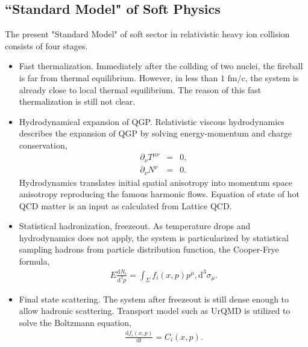 \documentclass[10pt,a4paper, twocolumn]{article}
\begin{document}
	\subsection{``Standard Model" of Soft Physics}
	The present "Standard Model" of soft sector in relativistic heavy ion collision consists of four stages.
	\begin{itemize}
		\item Fast thermalization. 
		Immediately after the collding of two nuclei, the fireball is far from thermal equilibrium. However, in less than $1 \textrm{ fm/c}$, the system is already close to local thermal equilibrium. 
		The reason of this fast thermalization is still not clear.
		\item Hydrodynamical expansion of QGP. 
		Relativistic viscous hydrodynamics describes the expansion of QGP by solving energy-momentum and charge conservation,
		\begin{eqnarray}
			\partial_\nu T^{\mu\nu} &=& 0, \\
			\partial_\nu N^{\nu} &=& 0. 
		\end{eqnarray}
		Hydrodynamics translates initial spatial anisotropy into momentum space anisotropy reproducing the famous harmonic flows. 
		Equation of state of hot QCD matter is an input as calculated from Lattice QCD.

		\item Statistical hadronization, freezeout. 
		As temperature drops and hydrodynamics does not apply, the system is particularized by statistical sampling hadrons from particle distribution function, the Cooper-Frye formula,
		\begin{eqnarray}
			E\frac{\mathrm{d}N_i}{\mathrm{d}^3p} = \int_\Sigma f_i(x, p)p^\mu,\mathrm{d}^3\sigma_\mu.
		\end{eqnarray}
		\item Final state scattering. 
		The system after freezeout is still dense enough to allow hadronic scattering. 
		Transport model such as UrQMD is utilized to solve the Boltzmann equation,
		\begin{eqnarray}
			\frac{\mathrm{d}f_i(x, p)}{\mathrm{d}t} = C_i(x, p).
		\end{eqnarray}
	\end{itemize}
\end{document}
